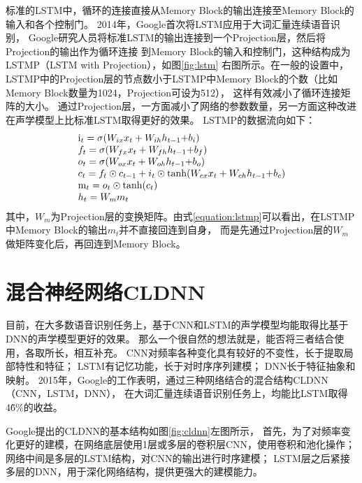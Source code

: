 标准的LSTM中，循环的连接直接从Memory Block的输出连接至Memory Block的输入和各个控制门。
2014年，Google首次将LSTM应用于大词汇量连续语音识别，
Google研究人员将标准LSTM的输出连接到一个Projection层，然后将Projection的输出作为循环连接
到Memory Block的输入和控制门，这种结构成为LSTMP（LSTM with Projection），如图\ref{fig:lstm}
右图所示。在一般的设置中，LSTMP中的Projection层的节点数小于LSTMP中Memory Block的个数（比如Memory Block数量为1024，Projection可设为512），
这样有效减小了循环连接矩阵的大小。
通过Projection层，一方面减小了网络的参数数量，另一方面这种改进在声学模型上比标准LSTM取得更好的效果。
LSTMP的数据流向如下：
\begin{equation}
\label{equation:lstmp}
\begin{array}{l}
{{\rm{i}}_t} = \sigma ({W_{ix}}{x_t} + {W_{ih}}{h_{t - 1}}{\rm{ + }}{b_i})\\
{f_t} = \sigma ({W_{fx}}{x_t} + {W_{fh}}{h_{t - 1}}{\rm{ + }}{b_f})\\
{o_t} = \sigma ({W_{ox}}{x_t} + {W_{oh}}{h_{t - 1}}{\rm{ + }}{b_o})\\
{c_t} = {f_t} \odot {c_{t - 1}} + {i_t} \odot \tanh ({W_{cx}}{x_t} + {W_{ch}}{h_{t - 1}}{\rm{ + }}{b_c})\\
{{\rm{m}}_t} = {o_t} \odot \tanh ({c_t})\\
{h_t} = {W_m}{m_t}
\end{array}
\end{equation}
其中，$W_m$为Projection层的变换矩阵。由式\ref{equation:lstmp}可以看出，在LSTMP中Memory Block的输出$m_t$并不直接回连到自身，
而是先通过Projection层的$W_m$做矩阵变化后，再回连到Memory Block。

\section{混合神经网络CLDNN}

目前，在大多数语音识别任务上，基于CNN和LSTM的声学模型均能取得比基于DNN的声学模型更好的效果。
那么一个很自然的想法就是，能否将三者结合使用，各取所长，相互补充。
CNN对频率各种变化具有较好的不变性，长于提取局部特性和特征；
LSTM有记忆功能，长于对时序序列建模；
DNN长于特征抽象和映射。
2015年，Google的工作表明，通过三种网络结合的混合结构CLDNN（CNN，LSTM，DNN），
在大词汇量连续语音识别任务上，均能比LSTM取得4\~6\%的收益。

Google提出的CLDNN的基本结构如图\ref{fig:cldnn}左图所示，
首先，为了对频率变化更好的建模，在网络底层使用1层或多层的卷积层CNN，使用卷积和池化操作； 
网络中间是多层的LSTM结构，对CNN的输出进行时序建模；
LSTM层之后紧接多层的DNN，用于深化网络结构，提供更强大的建模能力。

